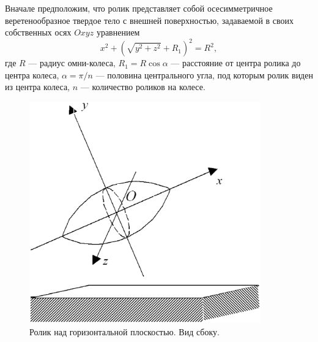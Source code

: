 

\label{sec3}
Вначале предположим, что ролик представляет собой осесимметричное 
веретенообразное твердое тело с внешней поверхностью, задаваемой в своих 
собственных осях $Oxyz$ уравнением
\begin{equation}
x^2+\left(\sqrt{y^2+z^2}+R_1\right) ^2=R^2,
\label{3_1}
\end{equation}
где $R$ --- радиус омни-колеса, $R_1=R\cos{\alpha }$ --- расстояние от центра
ролика до центра колеса, $\alpha =\pi /n$ --- половина центрального угла, под
которым ролик виден из центра колеса, $n$ --- количество роликов на колесе.

\begin{figure}[htb]
\centering\includegraphics[width=10cm]{content/parts/3_friction/nd/Roller.eps}
\caption{Ролик над горизонтальной плоскостью. Вид сбоку.}
\label{Roller}
\end{figure}

